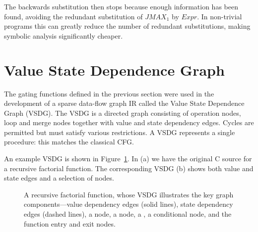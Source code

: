 
The backwards substitution then stops because enough information has been found, avoiding the redundant substitution of ${JMAX_1}$ by ${Expr}$. 
In non-trivial programs this can greatly reduce the number of redundant substitutions, making symbolic analysis significantly cheaper.

\section{Value State Dependence Graph}

The gating functions defined in the previous section were used in the development of a sparse data-flow graph IR called the Value State Dependence Graph (VSDG). 
The VSDG is a directed graph consisting of operation nodes, loop and merge nodes together with value and state dependency edges. 
Cycles are permitted but must satisfy various restrictions. 
A VSDG represents a single procedure: 
this matches the classical CFG.

An example VSDG is shown in Figure~\ref{fig:fac}. 
In (a) we have the original C source for a recursive factorial function. 
The corresponding VSDG (b) shows both value and state edges and a selection of nodes.

\begin{figure}[!htb]
  \centering
\caption{A recursive factorial function, whose VSDG illustrates the key graph components---value dependency edges (solid lines), state dependency edges (dashed lines), a  node, a  node, a \Gn, a conditional node, and the function entry and exit nodes.}
\label{fig:fac}
\end{figure}

